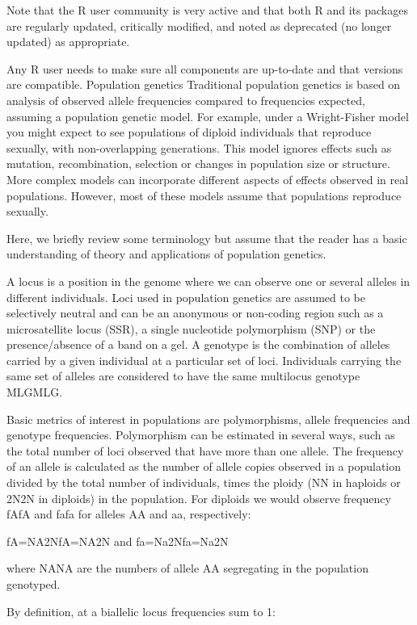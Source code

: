 \documentclass[12pt,]{krantz}
\theoremstyle{definition}
\theoremstyle{definition}
\theoremstyle{definition}
\theoremstyle{remark}
\begin{document}
Note that the R user community is very active and that both R and its
packages are regularly updated, critically modified, and noted as
deprecated (no longer updated) as appropriate.

Any R user needs to make sure all components are up-to-date and that
versions are compatible. Population genetics Traditional population
genetics is based on analysis of observed allele frequencies compared to
frequencies expected, assuming a population genetic model. For example,
under a Wright-Fisher model you might expect to see populations of
diploid individuals that reproduce sexually, with non-overlapping
generations. This model ignores effects such as mutation, recombination,
selection or changes in population size or structure. More complex
models can incorporate different aspects of effects observed in real
populations. However, most of these models assume that populations
reproduce sexually.

Here, we briefly review some terminology but assume that the reader has
a basic understanding of theory and applications of population genetics.

A locus is a position in the genome where we can observe one or several
alleles in different individuals. Loci used in population genetics are
assumed to be selectively neutral and can be an anonymous or non-coding
region such as a microsatellite locus (SSR), a single nucleotide
polymorphism (SNP) or the presence/absence of a band on a gel. A
genotype is the combination of alleles carried by a given individual at
a particular set of loci. Individuals carrying the same set of alleles
are considered to have the same multilocus genotype MLGMLG.

Basic metrics of interest in populations are polymorphisms, allele
frequencies and genotype frequencies. Polymorphism can be estimated in
several ways, such as the total number of loci observed that have more
than one allele. The frequency of an allele is calculated as the number
of allele copies observed in a population divided by the total number of
individuals, times the ploidy (NN in haploids or 2N2N in diploids) in
the population. For diploids we would observe frequency fAfA and fafa
for alleles AA and aa, respectively:

fA=NA2NfA=NA2N and fa=Na2Nfa=Na2N

where NANA are the numbers of allele AA segregating in the population
genotyped.

By definition, at a biallelic locus frequencies sum to 1:
\end{document}
